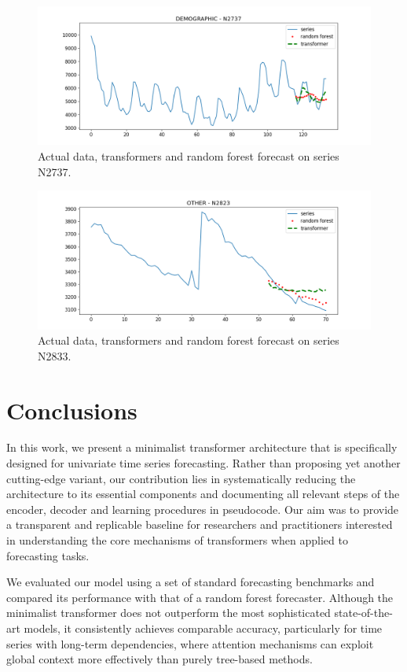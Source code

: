 \documentclass[algorithms,article,submit,pdftex,moreauthors]{Definitions/mdpi}
\begin{document}
\begin{figure}
	\centering
	\includegraphics[width=0.85\linewidth]{N2737.png}
	\caption{Actual data, transformers and random forest forecast on series N2737.}
	\label{fig:trbest}
\end{figure}
\begin{figure}
	\centering
	\includegraphics[width=0.85\linewidth]{N2823.png}
	\caption{Actual data, transformers and random forest forecast on series N2833.}
	\label{fig:trworse}
\end{figure}


\section{Conclusions} \label{sec:conclusions}

In this work, we present a minimalist transformer architecture that is specifically designed for univariate time series forecasting. Rather than proposing yet another cutting-edge variant, our contribution lies in systematically reducing the architecture to its essential components and documenting all relevant steps of the encoder, decoder and learning procedures in pseudocode. Our aim was to provide a transparent and replicable baseline for researchers and practitioners interested in understanding the core mechanisms of transformers when applied to forecasting tasks.

We evaluated our model using a set of standard forecasting benchmarks and compared its performance with that of a random forest forecaster. Although the minimalist transformer does not outperform the most sophisticated state-of-the-art models, it consistently achieves comparable accuracy, particularly for time series with long-term dependencies, where attention mechanisms can exploit global context more effectively than purely tree-based methods.
\end{document}
